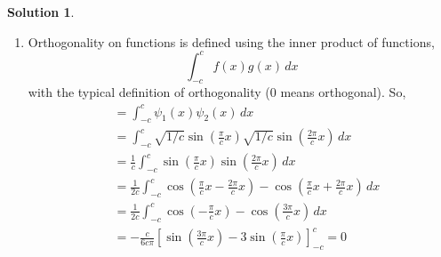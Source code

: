 \documentclass[10pt]{article}
\theoremstyle{definition}
\newtheorem{soln}{Solution}
\begin{document}
\begin{soln}
\begin{enumerate}[label=(\alph*)]
\begin{enumerate}[label=(\roman*)]
            \item Orthogonality on functions is defined using the inner product of functions,
                  $$\int_{-c}^c f(x)g(x)\,dx$$
                  with the typical definition of orthogonality (0 means orthogonal). So,
                  \begin{align*}
                     & =\int_{-c}^c\psi_1(x)\psi_2(x)\,dx                                                                                          \\
                     & =\int_{-c}^c\sqrt{1/c}\sin\left(\frac{\pi}{c}x\right)\sqrt{1/c}\sin\left(\frac{2\pi}{c}x\right)\,dx                         \\
                     & =\frac{1}{c}\int_{-c}^c\sin\left(\frac{\pi}{c}x\right)\sin\left(\frac{2\pi}{c}x\right)\,dx                                  \\
                     & =\frac{1}{2c}\int_{-c}^c\cos\left(\frac{\pi}{c}x-\frac{2\pi}{c}x\right)-\cos\left(\frac{\pi}{c}x+\frac{2\pi}{c}x\right)\,dx \\
                     & =\frac{1}{2c}\int_{-c}^c\cos\left(-\frac{\pi}{c}x\right)-\cos\left(\frac{3\pi}{c}x\right)\,dx                               \\
                     & =-\frac{c}{6c\pi}\left[\sin\left(\frac{3\pi}{c}x\right)-3\sin\left(\frac{\pi}{c}x\right)\right]_{-c}^c=0
                  \end{align*}
          \end{enumerate}
  \end{enumerate}
\end{soln}
\end{document}
